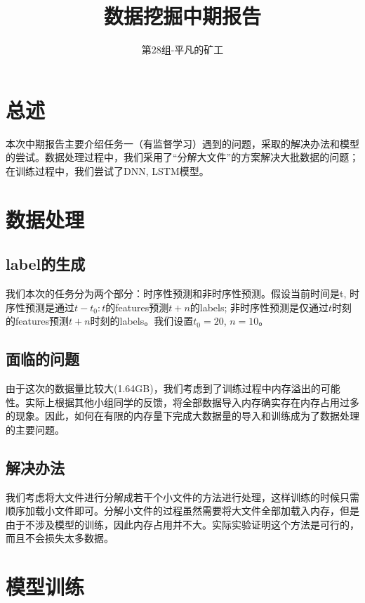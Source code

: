 \documentclass[UTF8]{ctexart}
\title{数据挖掘中期报告}
\date{}
\author{第28组-平凡的矿工}
\begin{document}
\maketitle
\section{总述}
本次中期报告主要介绍任务一（有监督学习）遇到的问题，采取的解决办法和模型的尝试。数据处理过程中，我们采用了“分解大文件”的方案解决大批数据的问题；在训练过程中，我们尝试了DNN, LSTM模型。
\section{数据处理}
\subsection{label的生成}
我们本次的任务分为两个部分：时序性预测和非时序性预测。假设当前时间是t, 时序性预测是通过$t-t_0:t$的features预测$t+n$的labels; 非时序性预测是仅通过$t$时刻的features预测$t+n$时刻的labels。我们设置$t_0=20$, $n=10$。
\subsection{面临的问题}
由于这次的数据量比较大(1.64GB)，我们考虑到了训练过程中内存溢出的可能性。实际上根据其他小组同学的反馈，将全部数据导入内存确实存在内存占用过多的现象。因此，如何在有限的内存量下完成大数据量的导入和训练成为了数据处理的主要问题。
\subsection{解决办法}
我们考虑将大文件进行分解成若干个小文件的方法进行处理，这样训练的时候只需顺序加载小文件即可。分解小文件的过程虽然需要将大文件全部加载入内存，但是由于不涉及模型的训练，因此内存占用并不大。实际实验证明这个方法是可行的，而且不会损失太多数据。
\section{模型训练}
\end{document}
